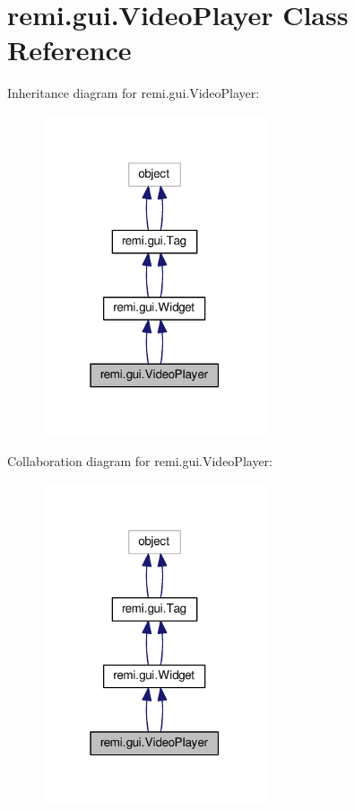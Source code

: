 \hypertarget{classremi_1_1gui_1_1VideoPlayer}{}\section{remi.\+gui.\+Video\+Player Class Reference}
\label{classremi_1_1gui_1_1VideoPlayer}


Inheritance diagram for remi.\+gui.\+Video\+Player\+:
\nopagebreak
\begin{figure}[H]
\begin{center}
\leavevmode
\includegraphics[width=187pt]{d8/d64/classremi_1_1gui_1_1VideoPlayer__inherit__graph}
\end{center}
\end{figure}


Collaboration diagram for remi.\+gui.\+Video\+Player\+:
\nopagebreak
\begin{figure}[H]
\begin{center}
\leavevmode
\includegraphics[width=187pt]{d4/d7e/classremi_1_1gui_1_1VideoPlayer__coll__graph}
\end{center}
\end{figure}
